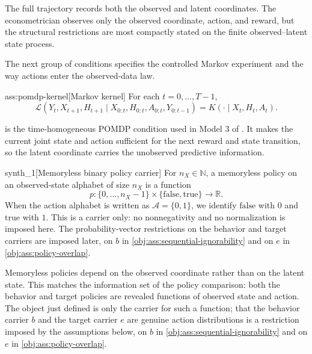 The full trajectory records both the observed and latent coordinates. The econometrician observes only the observed coordinate, action, and reward, but the structural restrictions are most compactly stated on the finite observed--latent state process.

The next group of conditions specifies the controlled Markov experiment and the way actions enter the observed-data law.

\begin{assumptionv}{ass:pomdp-kernel}[Markov kernel]
For each \(t=0,\ldots,T-1\),
\[
\mathcal L(Y_t,X_{t+1},H_{t+1}\mid X_{0:t},H_{0:t},A_{0:t},Y_{0:t-1})
=
K(\cdot\mid X_t,H_t,A_t).
\]
\end{assumptionv}

 is the time-homogeneous POMDP condition used in Model 3 of \citet{HuWager2023}. It makes the current joint state and action sufficient for the next reward and state transition, so the latent coordinate carries the unobserved predictive information.

\begin{definitionv}{synth_1}[Memoryless binary policy carrier]
For \(n_X\in\mathbb N\), a memoryless policy on an observed-state alphabet of size \(n_X\) is a function
\[
p:\{0,\ldots,n_X-1\}\times\{\mathrm{false},\mathrm{true}\}\to\mathbb R .
\]
When the action alphabet is written as \(\mathcal A=\{0,1\}\), we identify \(\mathrm{false}\) with \(0\) and \(\mathrm{true}\) with \(1\). This is a carrier only: no nonnegativity and no normalization is imposed here. The probability-vector restrictions on the behavior and target carriers are imposed later, on \(b\) in \cref{obj:ass:sequential-ignorability} and on \(e\) in \cref{obj:ass:policy-overlap}.
\end{definitionv}

Memoryless policies depend on the observed coordinate rather than on the latent state. This matches the information set of the policy comparison: both the behavior and target policies are revealed functions of observed state and action. The object just defined is only the carrier for such a function; that the behavior carrier \(b\) and the target carrier \(e\) are genuine action distributions is a restriction imposed by the assumptions below, on \(b\) in \cref{obj:ass:sequential-ignorability} and on \(e\) in \cref{obj:ass:policy-overlap}.

